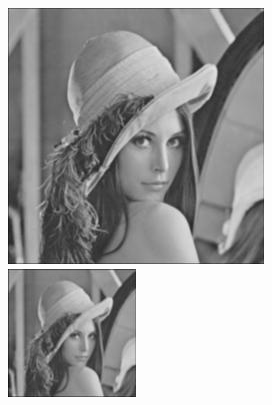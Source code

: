 \begin{figure}
	\centering
	\begin{subfigure}{.49\textwidth}
		\centering
		\includegraphics[width=.99\linewidth]{A6/1.jpg}
		\includegraphics[width=.99\linewidth]{A6/2.jpg}

\end{subfigure}
\end{figure}
